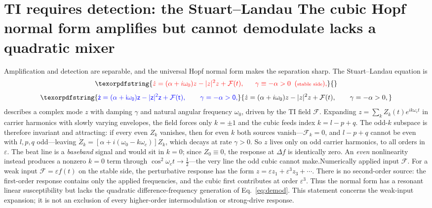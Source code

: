 \documentclass[11pt,a4paper]{article}
\newcommand{\half}{\tfrac{1}{2}}
\providecommand{\DIFaddtex}[1]{{\protect\color{blue} \sf #1}} %
\providecommand{\DIFdeltex}[1]{{\protect\color{red} \scriptsize #1}} %
\providecommand{\DIFaddbegin}{} %
\providecommand{\DIFaddend}{} %
\providecommand{\DIFdelbegin}{} %
\providecommand{\DIFdelend}{} %
\providecommand{\DIFadd}[1]{\texorpdfstring{\DIFaddtex{#1}}{#1}} %
\providecommand{\DIFdel}[1]{\texorpdfstring{\DIFdeltex{#1}}{}} %
\begin{document}
\section{\DIFdelbegin \DIFdel{TI requires detection: the Stuart--Landau }\DIFdelend \DIFaddbegin \DIFadd{The cubic Hopf }\DIFaddend normal form \DIFdelbegin \DIFdel{amplifies but cannot demodulate}\DIFdelend \DIFaddbegin \DIFadd{lacks a quadratic mixer}\DIFaddend }\label{app:sl}
\DIFdelbegin \DIFdel{Amplification and detection are separable, and the universal Hopf normal form makes the
separation sharp. }\DIFdelend The Stuart--Landau equation \cite{pikovsky2001}
\DIFdelbegin \DIFdel{is
}\begin{displaymath}
\DIFdel{\dot z=(\alpha+i\omega_0)z-|z|^2z+\mathcal{F}(t),\qquad \gamma\equiv-\alpha>0\ \ (\text{stable side}),
}\end{displaymath}%
\DIFdelend \DIFaddbegin \begin{equation}
\DIFadd{\dot z=(\alpha+i\omega_0)z-|z|^2z+\mathcal F(t),\qquad
\gamma=-\alpha>0,
\label{eq:sl}
}\end{equation}\DIFaddend
\DIFaddbegin \DIFadd{describes a complex mode $z$ with damping $\gamma$ and natural angular frequency
$\omega_0$, }\DIFaddend driven by the \DIFdelbegin \DIFdel{TI field $\mathcal{F}$. Expanding $z=\sum_k Z_k(t)e^{ik\omega_c t}$ in carrier
harmonics with slowly varying envelopes, the field forces only $k=\pm1$ and the cubic feeds
index $k=l-p+q$. The odd-$k$ subspace is therefore invariant and attracting: if every even
$Z_k$ vanishes, then for even $k$ both sources vanish---$\mathcal{F}_k=0$, and $l-p+q$ cannot be even
with $l,p,q$ odd---leaving $\dot Z_k=[\alpha+i(\omega_0-k\omega_c)]Z_k$, which decays at rate
$\gamma>0$. So $z$ lives only on odd carrier harmonics, to all orders in $\varepsilon$. The
beat line is a \emph{baseband} signal and would sit in $k=0$; since $Z_0\equiv0$, the
response at $\Delta f$ is identically zero. An \emph{even} nonlinearity instead produces a
nonzero $k=0$ term through $\cos^2\omega_c t\to\half$---the very line the odd cubic cannot
make.Numerically }\DIFdelend \DIFaddbegin \DIFadd{applied input $\mathcal F$. For a weak input
$\mathcal F=\varepsilon f(t)$ on the stable side, the perturbative response has
the form $z=\varepsilon z_1+\varepsilon^3z_3+\cdots$. There is no second-order
source: the first-order response contains only the applied frequencies, and the
cubic first contributes at order $\varepsilon^3$. Thus the normal form has a
resonant linear susceptibility but lacks the quadratic difference-frequency
generation of Eq.~\eqref{eq:demod}. This statement concerns the weak-input
expansion; it is not an exclusion of every higher-order intermodulation or
strong-drive response.
}
\end{document}
